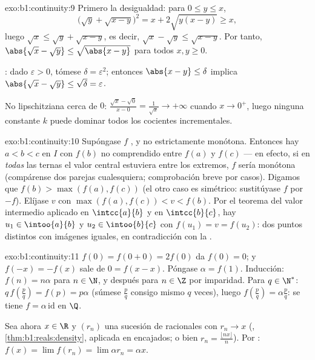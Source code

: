 \begin{solution}{exo:b1:continuity:9}
Primero la desigualdad: para $0 \leq y \leq x$,
\[
\bigl(\sqrt y + \sqrt{x - y}\bigr)^2 = x + 2\sqrt{y(x-y)} \geq x,
\]
luego $\sqrt x \leq \sqrt y + \sqrt{x - y}$, es decir,
$\sqrt x - \sqrt y \leq \sqrt{x - y}$. Por tanto,
$\abs{\sqrt x - \sqrt y} \leq \sqrt{\abs{x - y}}$ para todos
$x, y \geq 0$.

: dado $\varepsilon > 0$, tómese
$\delta = \varepsilon^2$; entonces $\abs{x - y} \leq \delta$ implica
$\abs{\sqrt x - \sqrt y} \leq \sqrt\delta = \varepsilon$.

No lipschitziana cerca de $0$:
$\frac{\sqrt x - \sqrt 0}{x - 0} = \frac{1}{\sqrt x} \to +\infty$
cuando $x \to 0^+$, luego ninguna constante $k$ puede dominar todos
los cocientes incrementales.
\end{solution}

\begin{solution}{exo:b1:continuity:10}
Supóngase $f$ ,  y no estrictamente monótona.
Entonces hay $a < b < c$ en $I$ con $f(b)$ no comprendido entre $f(a)$
y $f(c)$ --- en efecto, si en \emph{todas} las ternas el valor central
estuviera entre los extremos, $f$ sería monótona (compárense dos
parejas cualesquiera; comprobación breve por casos). Digamos que
$f(b) > \max(f(a), f(c))$ (el otro caso es simétrico: sustitúyase $f$
por $-f$). Elíjase $v$ con $\max(f(a), f(c)) < v < f(b)$. Por el
teorema del valor intermedio aplicado en $\intcc{a}{b}$ y en
$\intcc{b}{c}$, hay $u_1 \in \intoo{a}{b}$ y $u_2 \in \intoo{b}{c}$
con $f(u_1) = v = f(u_2)$: dos puntos distintos con imágenes iguales,
en contradicción con la .
\end{solution}

\begin{solution}{exo:b1:continuity:11}
$f(0) = f(0+0) = 2f(0)$ da $f(0) = 0$; y $f(-x) = -f(x)$ sale de
$0 = f(x - x)$. Póngase $\alpha = f(1)$. Inducción: $f(n) = n\alpha$
para $n \in \N$, y después para $n \in \Z$ por imparidad. Para
$q \in \N^*$: $q\,f(\frac pq) = f(p) = p\alpha$ (súmese $\frac pq$
consigo mismo $q$ veces), luego $f(\frac pq) = \alpha\frac pq$: se
tiene $f = \alpha\,\mathrm{id}$ en $\Q$.

Sea ahora $x \in \R$ y $(r_n)$ una sucesión de racionales con
$r_n \to x$ (, \cref{thm:b1:reals:density}, aplicada en
 encajados; o bien $r_n = \frac{\lfloor nx\rfloor}{n}$).
Por : $f(x) = \lim f(r_n) = \lim \alpha r_n = \alpha x$.
\end{solution}

